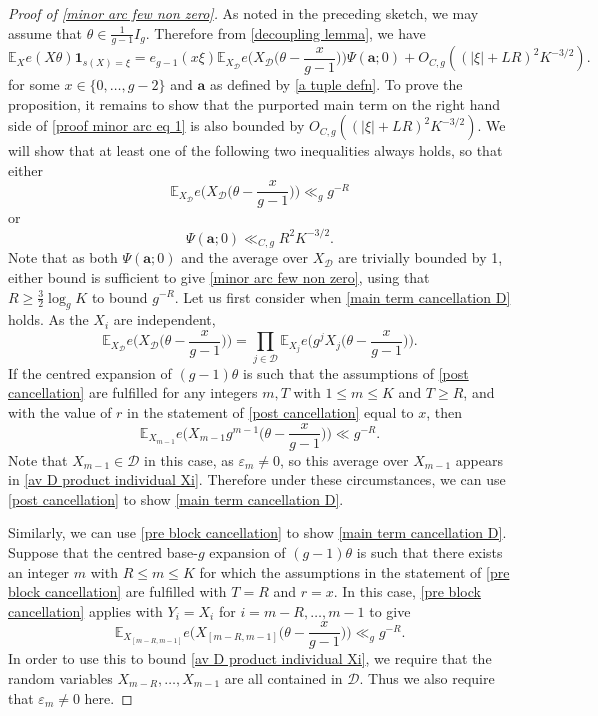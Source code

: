 \documentclass[hidelinks,11pt,reqno]{amsart}
\renewcommand{\leq}{\leqslant}
\renewcommand{\geq}{\geqslant}
\newcommand{\E}{\ensuremath{\mathbb{E}}}
\newcommand{\ind}{\mathbf{1}}
\newcommand{\xb}{X}
\newcommand{\xbd}{X_{\mathcal{D}}}
\newcommand{\ru}[1]{e_{g-1}(#1)}
\newcommand{\sx}[1]{s(#1)}
\theoremstyle{remark}
\begin{document}
\begin{proof}[Proof of \cref{minor arc few non zero}] As noted in the preceding sketch, we may assume that $\theta \in \tfrac{1}{g-1}I_{g}$. Therefore from \cref{decoupling lemma}, we have 
\begin{equation}\label{proof minor arc eq 1}
    \E_{\xb}e(\xb\theta)\ind_{\sx{\xb}=\xi}=\ru{x\xi}\E_{\xbd}e\Big(\xbd \Big(\theta-\frac{x}{g-1}\Big)\Big)\Psi(\mathbf{a};0)+O_{C,g}((|\xi|+LR)^{2}K^{-3/2}).
\end{equation}
for some $x\in\{0,\ldots, g-2\}$ and $\mathbf{a}$ as defined by \cref{a tuple defn}. To prove the proposition, it remains to show that the purported main term on the right hand side of \cref{proof minor arc eq 1} is also bounded by $O_{C,g}((|\xi|+LR)^{2}K^{-3/2})$. We will show that at least one of the following two inequalities always holds, so that either
\begin{equation}\label{main term cancellation D}
    \E_{\xbd}e\Big(\xbd \Big(\theta-\frac{x}{g-1}\Big)\Big)\ll_{g} g^{-R}
\end{equation}
or
\begin{equation}\label{main term cancellation psi}
    \Psi(\mathbf{a};0)\ll_{C,g} R^{2}K^{-3/2}.
\end{equation}
Note that as both $\Psi(\mathbf{a};0)$ and the average over $\xbd$ are trivially bounded by 1, either bound is sufficient to give \cref{minor arc few non zero}, using that $R\geq \tfrac{3}{2}\log_{g} K$ to bound $g^{-R}$. Let us first consider when \cref{main term cancellation D} holds. As the $X_{i}$ are independent, 
    \begin{equation}\label{av D product individual Xi}
        \E_{\xbd}e\Big(\xbd\Big (\theta-\frac{x}{g-1}\Big)\Big)=\prod_{j\in \mathcal{D}}\E_{X_{j}}e\Big(g^{j}X_{j}\Big (\theta-\frac{x}{g-1}\Big)\Big).
    \end{equation} 
If the centred expansion of $(g-1)\theta$ is such that the assumptions of \cref{post cancellation} are fulfilled for any integers $m,T$ with $1\leq m\leq K$ and $T\geq R$, and with the value of $r$ in the statement of \cref{post cancellation} equal to $x$, then
\[\E_{X_{m-1}}e\Big (X_{m-1}g^{m-1}\Big (\theta-\frac{x}{g-1}\Big )\Big )\ll g^{-R}.\]
Note that $X_{m-1}\in \mathcal{D}$ in this case, as $\varepsilon_{m}\neq 0$, so this average over $X_{m-1}$ appears in \cref{av D product individual Xi}. Therefore under these circumstances, we can use \cref{post cancellation} to show \cref{main term cancellation D}.

Similarly, we can use \cref{pre block cancellation} to show \cref{main term cancellation D}. Suppose that the centred base-$g$ expansion of $(g-1)\theta$ is such that there exists an integer $m$ with $R \leq m\leq K$ for which the assumptions in the statement of \cref{pre block cancellation} are fulfilled with $T=R$ and $r=x$. In this case, \cref{pre block cancellation} applies with $Y_{i}=X_{i}$ for $i=m-R,\ldots, m-1$ to give 
\[\E_{X_{[m-R,m-1]}}e\Big (X_{[m-R,m-1]}\Big (\theta-\frac{x}{g-1}\Big )\Big )\ll_{g} g^{-R}.\]
In order to use this to bound \cref{av D product individual Xi}, we require that the random variables $X_{m-R},\ldots, X_{m-1}$ are all contained in $\mathcal{D}$. Thus we also require that $\varepsilon_{m}\neq 0$ here.


\end{proof}
\end{document}
